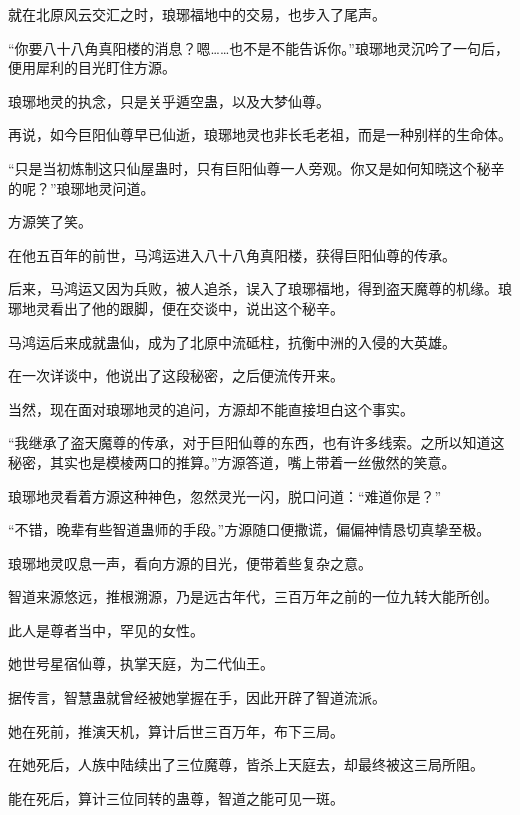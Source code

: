 
\begin{this_body}



就在北原风云交汇之时，琅琊福地中的交易，也步入了尾声。

“你要八十八角真阳楼的消息？嗯……也不是不能告诉你。”琅琊地灵沉吟了一句后，便用犀利的目光盯住方源。

琅琊地灵的执念，只是关乎遁空蛊，以及大梦仙尊。

再说，如今巨阳仙尊早已仙逝，琅琊地灵也非长毛老祖，而是一种别样的生命体。

“只是当初炼制这只仙屋蛊时，只有巨阳仙尊一人旁观。你又是如何知晓这个秘辛的呢？”琅琊地灵问道。

方源笑了笑。

在他五百年的前世，马鸿运进入八十八角真阳楼，获得巨阳仙尊的传承。

后来，马鸿运又因为兵败，被人追杀，误入了琅琊福地，得到盗天魔尊的机缘。琅琊地灵看出了他的跟脚，便在交谈中，说出这个秘辛。

马鸿运后来成就蛊仙，成为了北原中流砥柱，抗衡中洲的入侵的大英雄。

在一次详谈中，他说出了这段秘密，之后便流传开来。

当然，现在面对琅琊地灵的追问，方源却不能直接坦白这个事实。

“我继承了盗天魔尊的传承，对于巨阳仙尊的东西，也有许多线索。之所以知道这秘密，其实也是模棱两口的推算。”方源答道，嘴上带着一丝傲然的笑意。

琅琊地灵看着方源这种神色，忽然灵光一闪，脱口问道：“难道你是？”

“不错，晚辈有些智道蛊师的手段。”方源随口便撒谎，偏偏神情恳切真挚至极。

琅琊地灵叹息一声，看向方源的目光，便带着些复杂之意。

智道来源悠远，推根溯源，乃是远古年代，三百万年之前的一位九转大能所创。

此人是尊者当中，罕见的女性。

她世号星宿仙尊，执掌天庭，为二代仙王。

据传言，智慧蛊就曾经被她掌握在手，因此开辟了智道流派。

她在死前，推演天机，算计后世三百万年，布下三局。

在她死后，人族中陆续出了三位魔尊，皆杀上天庭去，却最终被这三局所阻。

能在死后，算计三位同转的蛊尊，智道之能可见一斑。


\end{this_body}
